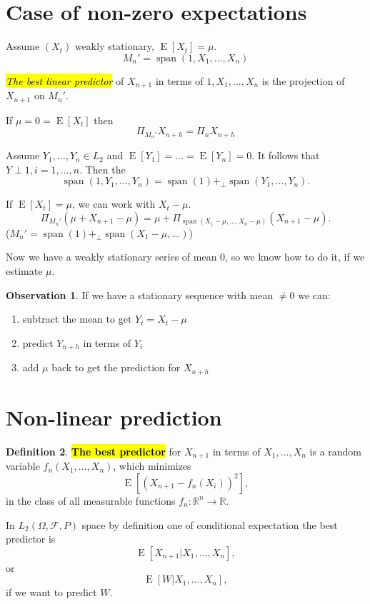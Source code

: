 \documentclass[12pt,a4paper, notitlepage]{book}
\newcommand{\hlc}[2][yellow]{ {\sethlcolor{#1} \hl{#2}} }
\newcommand{\hlcr}[1]{\hlc[lightred]{#1}}
\theoremstyle{definition} %
\newtheorem{definition}{Definition}[section]
\newtheorem{observation}[definition]{Observation}
\theoremstyle{plain} %
\newcommand{\R}{\mathbb R}
\newcommand{\Fc}{\mathcal{ F}}
\DeclareMathOperator{\E}{E}
\DeclareMathOperator{\Span}{span}
\newcommand{\New}[1]{ {\bf \hlcr{#1} } }
\newcommand{\Important}[1]{ {\it \hlc{#1} } }
\begin{document}
\section{Case of non-zero expectations}

Assume $(X_t)$ weakly stationary, $ \E[ X_t] = \mu$.
\[ M_n' = \Span(1, X_1, \dots, X_n) \]

\Important{The best linear predictor} of $X_{n+1}$ in terms of $1, X_1, \dots, X_n$ is the projection of $X_{n+1}$ on $M_n'$.

If $\mu = 0 = \E[ X_t] $ then 
\[ \Pi_{M_n'}X_{n+h} = \Pi_n X_{n+h} \]

Assume $Y_1, \dots, Y_n \in L_2$ and $\E[Y_1] = \dots = \E[Y_n] = 0$. It follows that $Y \perp 1, i = 1, \dots, n$.  Then the 
\[ \Span(1, Y_1, \dots, Y_n) = \Span(1) +_{\perp}  \Span(Y_1, \dots, Y_n). \]

If $ \E[ X_t] = \mu$, we can work with  $ X_t - \mu$. 
\[ \Pi_{M_n'}(\mu + X_{n+1} - \mu) = \mu + \Pi_{\Span(X_1 - \mu, \dots , X_n - \mu)}(X_{n+1}- \mu) . \]
($M_n' = \Span(1) +_{\perp} \Span(X_1 - \mu, \dots)$)

Now we have a weakly stationary series of mean $0$, so we know how to do it, if we estimate $\mu$. 

\begin{observation}
If we have a stationary sequence with mean $\neq 0$ we can:
\begin{enumerate}
\item subtract the mean to get $Y_t = X_t - \mu$
\item predict $Y_{n+h}$ in terms of $Y_i$
\item add $\mu$ back to get the prediction for $X_{n+h}$
\end{enumerate}
\end{observation}

\section{ Non-linear prediction}

\begin{definition}
\New{ The best predictor} for $X_{n+1}$ in terms of $X_1, \dots, X_n$ is a random variable $ f_n(X_1, \ldots , X_n)$, which minimizes 
\[ \E[(X_{n+1}- f_n(X_i))^2] , \]
 in the class of all measurable functions $f_n: \R^n \rightarrow \R$. 
\end{definition}

In $L_2(\Omega, \Fc, P)$ space by definition one of conditional expectation the best predictor is
\[ \E[X_{n+1} | X_1, \dots, X_n] , \]
 or 
\[ \E[W | X_1, \dots, X_n] , \]
 if we want to predict $W$. 
\end{document}
